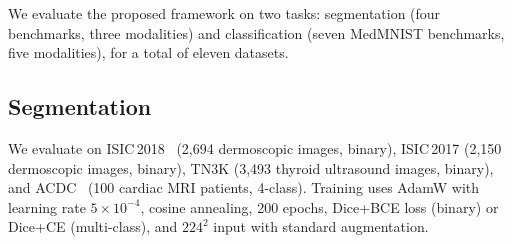 \documentclass[11pt]{article}
\begin{document}
We evaluate the proposed framework on two tasks: segmentation (four benchmarks, three modalities) and classification (seven MedMNIST benchmarks, five modalities), for a total of eleven datasets.

\subsection{Segmentation}

We evaluate on ISIC\,2018~\cite{codella2019isic2018} (2,694 dermoscopic images, binary), ISIC\,2017 (2,150 dermoscopic images, binary), TN3K (3,493 thyroid ultrasound images, binary), and ACDC~\cite{bernard2018acdc} (100 cardiac MRI patients, 4-class). Training uses AdamW with learning rate $5 \times 10^{-4}$, cosine annealing, 200 epochs, Dice+BCE loss (binary) or Dice+CE (multi-class), and $224^2$ input with standard augmentation.
\end{document}

